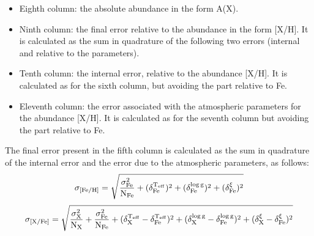 \documentclass[modern]{aastex701}
\begin{document}
\begin{itemize}
\begin{equation}
        \label{eq:par_fe}
    \end{equation}
    \begin{equation}
         \rm \sigma_{[X/Fe]}  
          = \sqrt{(\delta_{X}^{T_{\mathrm{eff}}} - \delta_{Fe}^{T_{\mathrm{eff}}})^2 + (\delta_{X}^{\log g} - \delta_{Fe}^{\log g})^2 + (\delta_{X}^{\xi} - \delta_{Fe}^{\xi})^2}
          \label{eq:par_xfe}
    \end{equation}
    where $\delta_{X}$ and $\delta_{Fe}$ are the means, over the lines used, of the differences (with their sign) given in the .fit file. Thanks to the sign, the errors due to the atmospheric parameters partly cancel for the species that change in the same way as Fe, and add up for the species that change in the opposite way (e.g. some ionized species with T$_{\mathrm{eff}}$). The lines with 99.99 are not used in these means; if no line of a species has the value, the errors that depend on it are 99.99.
    \item Eighth column: the absolute abundance in the form A(X).
    \item Ninth column: the final error relative to the abundance in the form [X/H]. It is calculated as the sum in quadrature of the following two errors (internal and relative to the parameters).
    \item Tenth column: the internal error, relative to the abundance [X/H]. It is calculated as for the sixth column, but avoiding the part relative to Fe.
    \item Eleventh column: the error associated with the atmospheric parameters for the abundance [X/H]. It is calculated as for the seventh column but avoiding the part relative to Fe. 
\end{itemize}

The final error present in the fifth column is calculated as the sum in quadrature of the internal error and the error due to the atmospheric parameters, as follows:     \begin{equation}
    \rm   \sigma_{[Fe/H]}=\sqrt{\frac{\sigma_{Fe}^2}{N_{Fe}}+(\delta_{Fe}^{T_{\mathrm{eff}}})^2+ (\delta_{Fe}^{\log g})^2 + (\delta_{Fe}^{\xi})^2}
        \label{eq:1}
\end{equation}
%
\begin{equation}
    \rm      \sigma_{[X/Fe]}  
          = \sqrt{\frac{\sigma_{X}^2}{N_{X}} + \frac{\sigma_{Fe}^2}{N_{Fe}} + (\delta_{X}^{T_{\mathrm{eff}}} - \delta_{Fe}^{T_{\mathrm{eff}}})^2 + (\delta_{X}^{\log g} - \delta_{Fe}^{\log g})^2 + (\delta_{X}^{\xi} - \delta_{Fe}^{\xi})^2}
          \label{eq:2}
\end{equation}
\end{document}
